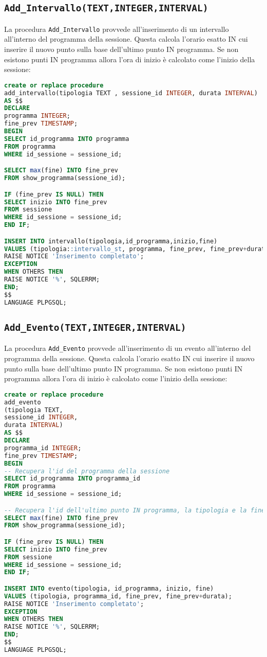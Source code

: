 \subsection{\texttt{Add\_Intervallo(TEXT,INTEGER,INTERVAL)}}
La procedura \texttt{Add\_Intervallo} provvede all'inserimento di un intervallo all'interno del programma della sessione. Questa calcola l'orario esatto IN cui inserire il nuovo punto sulla base dell'ultimo punto IN programma. Se non esistono punti IN programma allora l'ora di inizio è calcolato come l'inizio della sessione:
\begin{lstlisting}[language=SQL,style=mystyle]
create or replace procedure 
add_intervallo(tipologia TEXT , sessione_id INTEGER, durata INTERVAL)
AS $$
DECLARE
programma INTEGER;
fine_prev TIMESTAMP;
BEGIN
SELECT id_programma INTO programma
FROM programma
WHERE id_sessione = sessione_id;

SELECT max(fine) INTO fine_prev
FROM show_programma(sessione_id);

IF (fine_prev IS NULL) THEN
SELECT inizio INTO fine_prev
FROM sessione
WHERE id_sessione = sessione_id;
END IF;

INSERT INTO intervallo(tipologia,id_programma,inizio,fine)
VALUES (tipologia::intervallo_st, programma, fine_prev, fine_prev+durata);
RAISE NOTICE 'Inserimento completato';
EXCEPTION
WHEN OTHERS THEN
RAISE NOTICE '%', SQLERRM;
END;
$$ 
LANGUAGE PLPGSQL;
\end{lstlisting}
\subsection{\texttt{Add\_Evento(TEXT,INTEGER,INTERVAL)}}
La procedura \texttt{Add\_Evento} provvede all'inserimento di un evento all'interno del programma della sessione. Questa calcola l'orario esatto IN cui inserire il nuovo punto sulla base dell'ultimo punto IN programma. Se non esistono punti IN programma allora l'ora di inizio è calcolato come l'inizio della sessione:
\begin{lstlisting}[language=SQL,style=mystyle]
create or replace procedure 
add_evento
(tipologia TEXT, 
sessione_id INTEGER, 
durata INTERVAL)
AS $$
DECLARE
programma_id INTEGER;
fine_prev TIMESTAMP;
BEGIN
-- Recupera l'id del programma della sessione
SELECT id_programma INTO programma_id
FROM programma
WHERE id_sessione = sessione_id;

-- Recupera l'id dell'ultimo punto IN programma, la tipologia e la fine
SELECT max(fine) INTO fine_prev
FROM show_programma(sessione_id);

IF (fine_prev IS NULL) THEN
SELECT inizio INTO fine_prev
FROM sessione
WHERE id_sessione = sessione_id;
END IF;

INSERT INTO evento(tipologia, id_programma, inizio, fine)
VALUES (tipologia, programma_id, fine_prev, fine_prev+durata);
RAISE NOTICE 'Inserimento completato';
EXCEPTION
WHEN OTHERS THEN
RAISE NOTICE '%', SQLERRM;
END;
$$
LANGUAGE PLPGSQL;
\end{lstlisting}
